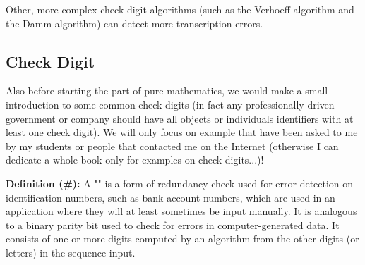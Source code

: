 	Other, more complex check-digit algorithms (such as the Verhoeff algorithm and the Damm algorithm) can detect more transcription errors.
	
	\pagebreak
	\subsection{Check Digit}
	Also before starting the part of pure mathematics, we would make a small introduction to some common check digits (in fact any professionally driven government or company should have all objects or individuals identifiers with at least one check digit). We will only focus on example that have been asked to me by my students or people that contacted me on the Internet (otherwise I can dedicate a whole book only for examples on check digits...)!
	
	\textbf{Definition (\#\mydef):} A "" is a form of redundancy check used for error detection on identification numbers, such as bank account numbers, which are used in an application where they will at least sometimes be input manually. It is analogous to a binary parity bit used to check for errors in computer-generated data. It consists of one or more digits computed by an algorithm from the other digits (or letters) in the sequence input.
	
